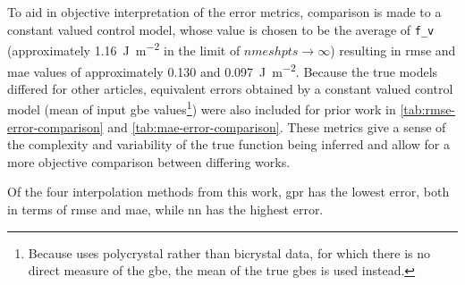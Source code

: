\documentclass[preprint,12pt]{elsarticle}
\begin{document}

To aid in objective interpretation of the error metrics, comparison is made to a constant valued control model, whose value is chosen to be the average of \texttt{f\_v} (approximately \SI{1.16}{\J\per\square\meter} in the limit of $nmeshpts \rightarrow \infty$) resulting in \gls{rmse} and \gls{mae} values of approximately \num{0.130} and \SI{0.097}{\J\per\square\meter}. Because the true models differed for other articles, equivalent errors obtained by a constant valued control model (mean of input \gls{gbe} values\footnote{Because \cite{shenDeterminingGrainBoundary2019} uses polycrystal rather than bicrystal data, for which there is no direct measure of the \gls{gbe}, the mean of the true \glspl{gbe} is used instead.}) were also included for prior work in \cref{tab:rmse-error-comparison} and \cref{tab:mae-error-comparison}. These metrics give a sense of the complexity and variability of the true function being inferred and allow for a more objective comparison between differing works.

Of the four interpolation methods from this work, \Gls{gpr} has the lowest error, both in terms of \gls{rmse} and \gls{mae}, while \gls{nn} has the highest error. %
\end{document}
